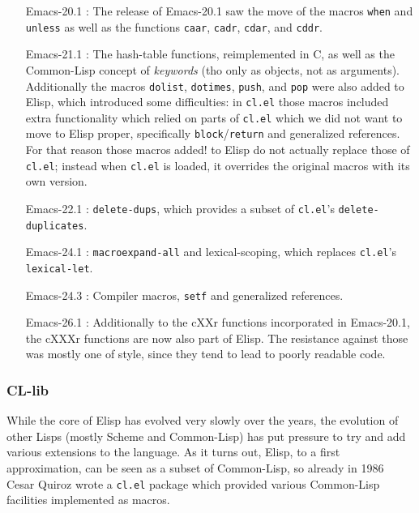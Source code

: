 \documentclass[format=acmsmall, review=false, screen=true]{acmart}
\newcommand \Elisp {Elisp}
\begin{document}
\begin{itemize}
\item [Emacs-20.1]: The release of Emacs-20.1 saw the move of the macros
  \texttt{when} and \texttt{unless} as well as the functions \texttt{caar},
  \texttt{cadr}, \texttt{cdar}, and \texttt{cddr}.
\item [Emacs-21.1]: The hash-table functions, reimplemented in C, as well as
  the Common-Lisp concept of \emph{keywords} (tho only as objects, not as
  arguments).  Additionally the macros \texttt{dolist}, \texttt{dotimes},
  \texttt{push}, and \texttt{pop} were also added to \Elisp{}, which
  introduced some difficulties: in \texttt{cl.el} those macros included
  extra functionality which relied on parts of \texttt{cl.el} which we did
  not want to move to \Elisp{} proper, specifically
  \texttt{block}/\texttt{return} and generalized references.  For that
  reason those macros added! to \Elisp{} do not actually replace those of
  \texttt{cl.el}; instead when \texttt{cl.el} is loaded, it overrides the
  original macros with its own version.
\item [Emacs-22.1]: \texttt{delete-dups}, which provides a subset of
  \texttt{cl.el}'s \texttt{delete-duplicates}.
\item [Emacs-24.1]: \texttt{macroexpand-all} and lexical-scoping, which
  replaces \texttt{cl.el}'s \texttt{lexical-let}.
\item [Emacs-24.3]: Compiler macros, \texttt{setf} and
  generalized references.
\item [Emacs-26.1]: Additionally to the cXXr functions incorporated in
  Emacs-20.1, the cXXXr functions are now also part of \Elisp{}.
  The resistance against those was mostly one of style, since they tend to
  lead to poorly readable code.
\end{itemize}

\subsubsection{CL-lib}          %

While the core of \Elisp{} has evolved very slowly over the years, the
evolution of other Lisps (mostly Scheme and Common-Lisp) has put pressure to
try and add various extensions to the language.  As it turns out, \Elisp{},
to a first approximation, can be seen as a subset of Common-Lisp, so already
in 1986 Cesar Quiroz wrote a \texttt{cl.el} package which provided various
Common-Lisp facilities implemented as macros.
\end{document}
